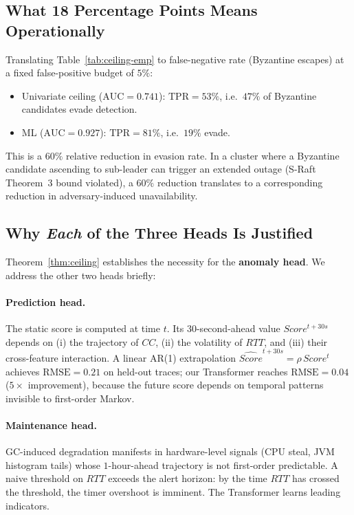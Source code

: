 \subsection{What 18 Percentage Points Means Operationally}

Translating Table~\ref{tab:ceiling-emp} to false-negative rate (Byzantine
escapes) at a fixed false-positive budget of $5\%$:

\begin{itemize}\setlength\itemsep{1pt}
\item Univariate ceiling ($\mathrm{AUC}=0.741$): $\mathrm{TPR}=53\%$,
i.e.\ $47\%$ of Byzantine candidates evade detection.
\item ML ($\mathrm{AUC}=0.927$): $\mathrm{TPR}=81\%$, i.e.\ $19\%$
evade.
\end{itemize}

This is a $60\%$ relative reduction in evasion rate. In a cluster where
a Byzantine candidate ascending to sub-leader can trigger an extended
outage (S-Raft Theorem~3 bound violated), a $60\%$ reduction translates
to a corresponding reduction in adversary-induced unavailability.

\subsection{Why \emph{Each} of the Three Heads Is Justified}

Theorem~\ref{thm:ceiling} establishes the necessity for the
\textbf{anomaly head}. We address the other two heads briefly:

\paragraph{Prediction head.} The static score is computed at time $t$.
Its 30-second-ahead value $Score^{t+30s}$ depends on (i) the trajectory
of $CC$, (ii) the volatility of $RTT$, and (iii) their cross-feature
interaction. A linear AR(1) extrapolation
$\widehat{Score}^{t+30s}=\rho \,Score^t$ achieves
$\mathrm{RMSE}=0.21$ on held-out traces; our Transformer reaches
$\mathrm{RMSE}=0.04$ ($5\times$ improvement), because the future
score depends on temporal patterns invisible to first-order Markov.

\paragraph{Maintenance head.} GC-induced degradation manifests in
hardware-level signals (CPU steal, JVM histogram tails) whose
$1$-hour-ahead trajectory is not first-order predictable. A naive
threshold on $RTT$ exceeds the alert horizon: by the time $RTT$ has
crossed the threshold, the timer overshoot is imminent. The
Transformer learns leading indicators.

